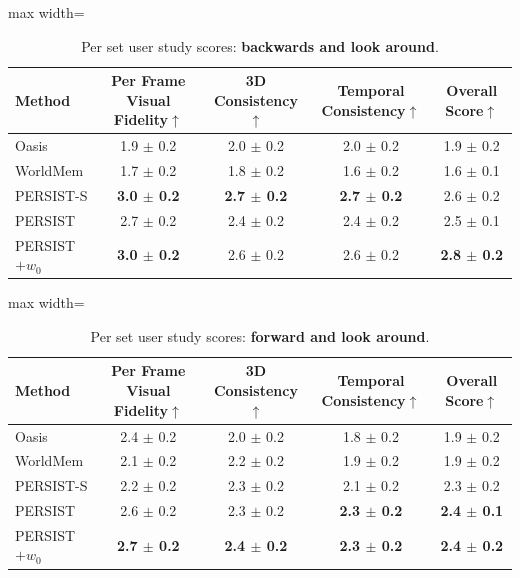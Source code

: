 \begin{subappendices}
\begin{table}[htb!]
\centering
\caption{Per set user study scores: \textbf{backwards and look around}.}\label{c4:tab:user_study_scores_backward_and_look_around}
\begin{adjustbox}{max width=\linewidth}
\begin{tabular}{lcccc}
\toprule
Method & Per Frame Visual Fidelity$\uparrow$ & 3D Consistency$\uparrow$ & Temporal Consistency$\uparrow$ & Overall Score$\uparrow$ \\
\midrule
Oasis & 1.9 $\pm$ 0.2 & 2.0 $\pm$ 0.2 & 2.0 $\pm$ 0.2 & 1.9 $\pm$ 0.2 \\
WorldMem & 1.7 $\pm$ 0.2 & 1.8 $\pm$ 0.2 & 1.6 $\pm$ 0.2 & 1.6 $\pm$ 0.1 \\
PERSIST-S & \textbf{3.0 $\pm$ 0.2} & \textbf{2.7 $\pm$ 0.2} & \textbf{2.7 $\pm$ 0.2} & 2.6 $\pm$ 0.2 \\
PERSIST & 2.7 $\pm$ 0.2 & 2.4 $\pm$ 0.2 & 2.4 $\pm$ 0.2 & 2.5 $\pm$ 0.1 \\
PERSIST$+w_0$ & \textbf{3.0 $\pm$ 0.2} & 2.6 $\pm$ 0.2 & 2.6 $\pm$ 0.2 & \textbf{2.8 $\pm$ 0.2} \\
\bottomrule
\end{tabular}
\end{adjustbox}
\end{table}

\begin{table}[htb!]
\caption{Per set user study scores: \textbf{forward and look around}.}
\label{c4:tab:user_study_scores_forward_and_look_around}
\centering
\begin{adjustbox}{max width=\linewidth}
\begin{tabular}{lcccc}
\toprule
Method & Per Frame Visual Fidelity$\uparrow$ & 3D Consistency$\uparrow$ & Temporal Consistency$\uparrow$ & Overall Score$\uparrow$ \\
\midrule
Oasis & 2.4 $\pm$ 0.2 & 2.0 $\pm$ 0.2 & 1.8 $\pm$ 0.2 & 1.9 $\pm$ 0.2 \\
WorldMem & 2.1 $\pm$ 0.2 & 2.2 $\pm$ 0.2 & 1.9 $\pm$ 0.2 & 1.9 $\pm$ 0.2 \\
PERSIST-S & 2.2 $\pm$ 0.2 & 2.3 $\pm$ 0.2 & 2.1 $\pm$ 0.2 & 2.3 $\pm$ 0.2 \\
PERSIST & 2.6 $\pm$ 0.2 & 2.3 $\pm$ 0.2 & \textbf{2.3 $\pm$ 0.2} & \textbf{2.4 $\pm$ 0.1} \\
PERSIST$+w_0$ & \textbf{2.7 $\pm$ 0.2} & \textbf{2.4 $\pm$ 0.2} & \textbf{2.3 $\pm$ 0.2} & \textbf{2.4 $\pm$ 0.2} \\\bottomrule
\end{tabular}
\end{adjustbox}
\end{table}



\end{subappendices}
